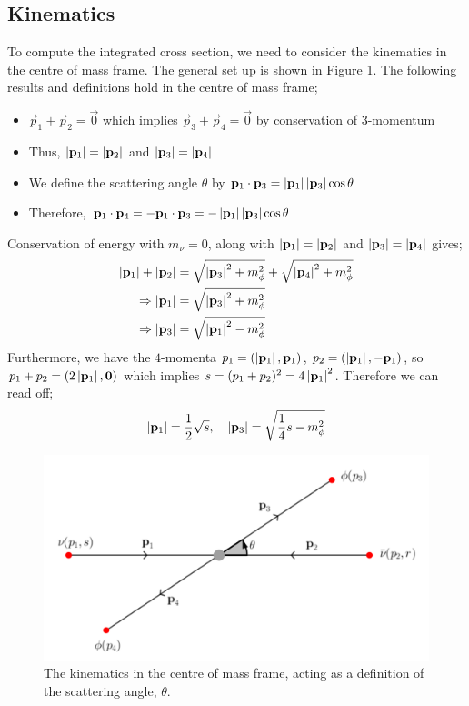\documentclass[10pt]{article}
\begin{document}
\subsection{Kinematics}
To compute the integrated cross section, we need to consider the kinematics in the centre of mass frame. The general set up is shown in Figure \ref{fig:kinematics}. The following results and definitions hold in the centre of mass frame;
\begin{itemize}
\item $\vec{p}_1 + \vec{p}_2 = \vec{0}$ which implies $\vec{p}_3 + \vec{p}_4 = \vec{0}$ by conservation of $3$-momentum
\item Thus, $\left| \mathbf{p}_1 \right| = \left| \mathbf{p}_2 \right|$ and $\left| \mathbf{p}_3 \right| = \left| \mathbf{p}_4 \right|$
\item We define the scattering angle $\theta$ by $\mathbf{p}_1 \cdot \mathbf{p}_3 = \left| \mathbf{p}_1 \right|\left| \mathbf{p}_3 \right|\cos \theta$
\item Therefore, $\mathbf{p}_1 \cdot \mathbf{p}_4 = -\mathbf{p}_1 \cdot \mathbf{p}_3 =  -\left| \mathbf{p}_1 \right|\left| \mathbf{p}_3 \right|\cos \theta$
\end{itemize}
Conservation of energy with $m_\nu = 0$, along with $\left| \mathbf{p}_1 \right| = \left| \mathbf{p}_2 \right|$ and $\left| \mathbf{p}_3 \right| = \left| \mathbf{p}_4 \right|$ gives;
\begin{align*}
\left| \mathbf{p}_1 \right| + \left| \mathbf{p}_2 \right| &= \sqrt{\left| \mathbf{p}_3 \right|^2 + m_\phi^2} + \sqrt{\left| \mathbf{p}_4 \right|^2 + m_\phi^2} \\
\Rightarrow  \left| \mathbf{p}_1 \right| &= \sqrt{\left| \mathbf{p}_3 \right|^2 + m_\phi^2} \\
\Rightarrow  \left| \mathbf{p}_3 \right| &= \sqrt{\left| \mathbf{p}_1 \right|^2 - m_\phi^2}
\end{align*}
Furthermore, we have the $4$-momenta $p_1 = (\left| \mathbf{p}_1 \right|, \mathbf{p}_1)$, $p_2 =  (\left| \mathbf{p}_1 \right|, -\mathbf{p}_1)$, so $p_1 + p_2 = (2\left| \mathbf{p}_1 \right|, \mathbf{0})$ which implies $s = (p_1 + p_2)^2 = 4\left| \mathbf{p}_1 \right|^2$. Therefore we can read off;
\begin{equation}
\left| \mathbf{p}_1 \right| = \frac{1}{2}\sqrt{s}, \quad \left| \mathbf{p}_3 \right| = \sqrt{\frac{1}{4}s - m_\phi^2}
\end{equation}
\begin{figure}
\begin{framed}
 \centering
 \includegraphics[width=0.6\linewidth]{comdiag}
 \caption{The kinematics in the centre of mass frame, acting as a definition of the scattering angle, $\theta$.}
 \label{fig:kinematics}
 \end{framed}
\end{figure}
\end{document}
